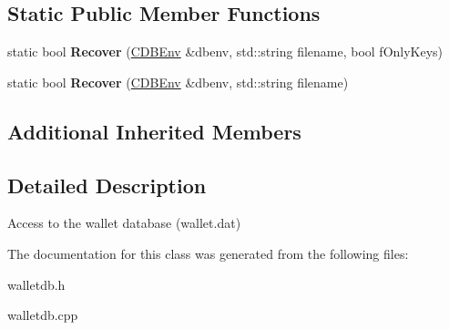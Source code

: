 \subsection*{Static Public Member Functions}
\begin{DoxyCompactItemize}
\item 
\mbox{\label{class_c_wallet_d_b_a3ebeb12f37d9c66512e2bc2903a6854a}} 
static bool {\bfseries Recover} (\mbox{\hyperlink{class_c_d_b_env}{C\+D\+B\+Env}} \&dbenv, std\+::string filename, bool f\+Only\+Keys)
\item 
\mbox{\label{class_c_wallet_d_b_a44388f1c3ee63191dcb78b1001e9390c}} 
static bool {\bfseries Recover} (\mbox{\hyperlink{class_c_d_b_env}{C\+D\+B\+Env}} \&dbenv, std\+::string filename)
\end{DoxyCompactItemize}
\subsection*{Additional Inherited Members}


\subsection{Detailed Description}
Access to the wallet database (wallet.\+dat) 

The documentation for this class was generated from the following files\+:\begin{DoxyCompactItemize}
\item 
walletdb.\+h\item 
walletdb.\+cpp\end{DoxyCompactItemize}
